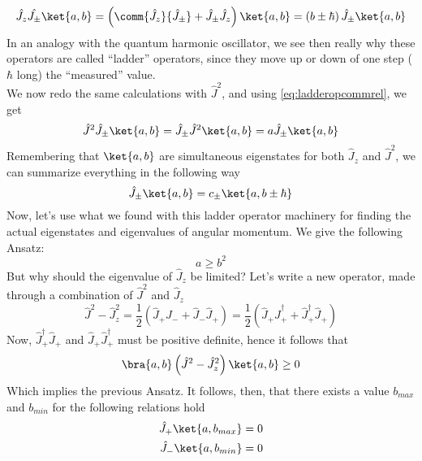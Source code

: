 \documentclass[a4paper, 11pt]{book}
\newcommand{\1}{\opr{\mathds{1}}}
\newcommand{\opr}[1]{\hat{#1}}
\newcommand{\adj}[2][]{#2^{\dagger#1}}
\theoremstyle{plain}
\begin{document}
	\begin{equation*}
		\opr{J_z}\opr{J_{\pm}}\ket{a,b}=\left( \comm{\opr{J}_z}{\opr{J}_{\pm}}+\opr{J}_{\pm}\opr{J}_z \right)\ket{a,b}=\left( b\pm\hbar \right)\opr{J}_{\pm}\ket{a,b}
		\label{eq:ladderaction}
	\end{equation*}
	In an analogy with the quantum harmonic oscillator, we see then really why these operators are called ``ladder'' operators, since they move up or down of one step ($\hbar$ long) the ``measured'' value.\\
	We now redo the same calculations with $\opr{J}^2$, and using \eqref{eq:ladderopcommrel}, we get
	\begin{equation}
		\opr{J}^2\opr{J}_{\pm}\ket{a,b}=\opr{J}_{\pm}\opr{J}^2\ket{a,b}=a\opr{J}_{\pm}\ket{a,b}
		\label{eq:jsqjpmaction}
	\end{equation}
	Remembering that $\ket{a,b}$ are simultaneous eigenstates for both $\opr{J}_z$ and $\opr{J}^2$, we can summarize everything in the following way
	\begin{equation}
		\opr{J}_{\pm}\ket{a,b}=c_{\pm}\ket{a,b\pm\hbar}
		\label{eq:ladderact}
	\end{equation}
	Now, let's use what we found with this ladder operator machinery for finding the actual eigenstates and eigenvalues of angular momentum. We give the following Ansatz:
	\begin{equation*}
		a\ge b^2
	\end{equation*}
	But why should the eigenvalue of $\opr{J}_z$ be limited? Let's write a new operator, made through a combination of $\opr{J}^2$ and $\opr{J}_z$
	\begin{equation}
		\opr{J}^2-\opr{J}_z^2=\frac{1}{2}\left( \opr{J}_+\opr{J}_-+\opr{J}_-\opr{J}_+ \right)=\frac{1}{2}\left( \opr{J}_+\adj{\opr{J}}_++\adj{\opr{J}}_+\opr{J}_+ \right)
		\label{eq:jsqjzjpmtie}
	\end{equation}
	Now, $\adj{\opr{J}}_+\opr{J}_+$ and $\opr{J}_+\adj{\opr{J}}_+$ must be positive definite, hence it follows that
	\begin{equation*}
		\bra{a,b}\left( \opr{J}^2-\opr{J}_z^2 \right)\ket{a,b}\ge0
	\end{equation*}
	Which implies the previous Ansatz. It follows, then, that there exists a value $b_{max}$ and $b_{min}$ for the following relations hold
	\begin{equation}
		\begin{aligned}
			\opr{J}_+\ket{a,b_{max}}&=0\\
			\opr{J}_-\ket{a,b_{min}}&=0
		\end{aligned}
		\label{eq:bmaxminangmom}
	\end{equation}
\end{document}
